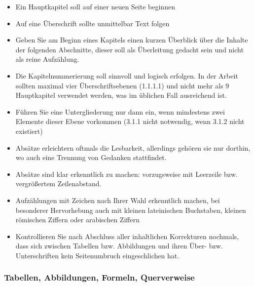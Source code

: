 \begin{itemize}
    \item Ein Hauptkapitel soll auf einer neuen Seite beginnen
    \item Auf eine Überschrift sollte unmittelbar Text folgen
    \item Geben Sie am Beginn eines Kapitels einen kurzen Überblick über die Inhalte der folgenden Abschnitte, dieser soll als Überleitung gedacht sein und nicht als reine Aufzählung.
    \item Die Kapitelnummerierung soll sinnvoll und logisch erfolgen. In der Arbeit sollten maximal vier Überschriftsebenen (1.1.1.1) und nicht mehr als 9 Hauptkapitel verwendet werden, was im üblichen Fall ausreichend ist.
    \item Führen Sie eine Untergliederung nur dann ein, wenn mindestens zwei Elemente dieser Ebene vorkommen (3.1.1 nicht notwendig, wenn 3.1.2 nicht existiert)
    \item Absätze erleichtern oftmals die Lesbarkeit, allerdings gehören sie nur dorthin, wo auch eine Trennung von Gedanken stattfindet.
    \item Absätze sind klar erkenntlich zu machen: vorzugsweise mit Leerzeile bzw. vergrößertem Zeilenabstand.
    \item Aufzählungen mit Zeichen nach Ihrer Wahl erkenntlich machen, bei besonderer Hervorhebung auch mit kleinen lateinischen Buchstaben, kleinen römischen Ziffern oder arabischen Ziffern
    \item Kontrollieren Sie nach Abschluss aller inhaltlichen Korrekturen nochmals, dass sich zwischen Tabellen bzw. Abbildungen und ihren Über- bzw. Unterschriften kein Seitenumbruch eingeschlichen hat.
\end{itemize}

\newpage

\subsubsection{Tabellen, Abbildungen, Formeln, Querverweise}
\label{sec:tabellen, abbildungen, formeln, querverweise}

